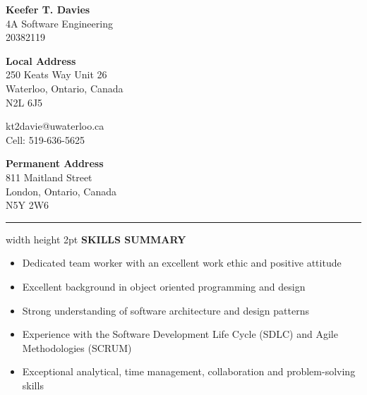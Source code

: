 \documentclass[10pt,letterpaper]{article}
\begin{document}
\begin{center}
    {\Large \textbf{Keefer T. Davies}}\\		
    4A Software Engineering\\
    20382119
\end{center}
\begin{minipage}{0.33\columnwidth}
    \textbf{Local Address}\\
    250 Keats Way Unit 26\\		
    Waterloo, Ontario, Canada\\		
    N2L 6J5
\end{minipage}
\begin{minipage}{0.33\columnwidth}
    \begin{center}
	kt2davie@uwaterloo.ca\\			
	Cell: 519-636-5625
    \end{center}
\end{minipage}
\begin{minipage}{0.33\columnwidth}
    \begin{adjustwidth}{0.25\columnwidth}{}
	{\textbf{Permanent Address}}\\			
	811 Maitland Street\\			
	London, Ontario, Canada\\			
	N5Y 2W6
    \end{adjustwidth}
\end{minipage}
\vspace{1em}
\hrule width \hsize height 2pt 
\vspace{1em}
\noindent \textbf{SKILLS SUMMARY} \hrulefill \\
\begin{adjustwidth}{0.1in}{0.5in}    
    \begin{itemize}
    \item Dedicated team worker with an excellent work ethic and positive attitude
	\item Excellent background in object oriented programming and design
	\item Strong understanding of software architecture and design patterns
	\item Experience with the Software Development Life Cycle (SDLC) and Agile Methodologies (SCRUM)
	\item Exceptional analytical, time management, collaboration and problem-solving skills
    \end{itemize}
\end{adjustwidth}
\vspace{1em}
\end{document}
